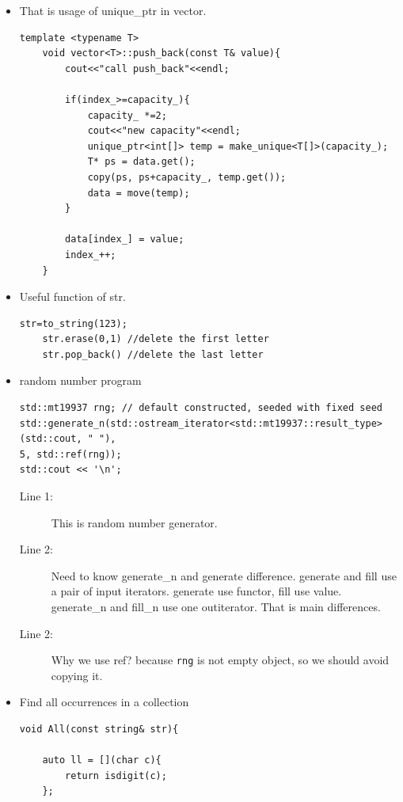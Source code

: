 \documentclass[a4paper,11pt,twoside]{book}
\begin{document}
\begin{itemize}
\item That is usage of unique\_ptr in vector. 

\begin{lstlisting}[numbers=none]
	template <typename T>
	void vector<T>::push_back(const T& value){
		cout<<"call push_back"<<endl;
		
		if(index_>=capacity_){
			capacity_ *=2;
			cout<<"new capacity"<<endl;
			unique_ptr<int[]> temp = make_unique<T[]>(capacity_);
			T* ps = data.get();
			copy(ps, ps+capacity_, temp.get());
			data = move(temp);
		}
		
		data[index_] = value;
		index_++;
	}
\end{lstlisting}


\item Useful function of str.
\begin{lstlisting}[numbers=none]
	str=to_string(123);
	str.erase(0,1) //delete the first letter
	str.pop_back() //delete the last letter
\end{lstlisting}

\item random number program
\begin{lstlisting}[numbers=none]
std::mt19937 rng; // default constructed, seeded with fixed seed
std::generate_n(std::ostream_iterator<std::mt19937::result_type>(std::cout, " "),
5, std::ref(rng));
std::cout << '\n';
\end{lstlisting}
\begin{description}
	\item[Line 1:] This is random number generator. 
	\item[Line 2:] Need to know generate\_n and generate difference. generate and fill use a pair of input iterators. generate use functor, fill use value. generate\_n and fill\_n use one outiterator. That is main differences. 
	\item[Line 2:] Why we use ref? because \texttt{rng} is not empty object, so we should avoid copying it. 
	
\end{description}

\item Find all occurrences in a collection
\begin{lstlisting}[numbers=none]
void All(const string& str){
	
	auto ll = [](char c){
		return isdigit(c);
	};
	

\end{lstlisting}
\end{itemize}
\end{document}

